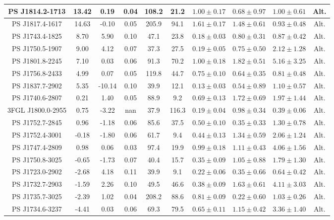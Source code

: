 \begin{table*}
\begin{tabular}{|c|c|c|c|c|c|c|c|c|c|}
\hline 
 PS J1814.2-1713 & 13.42 & 0.19 & 0.04 & 108.2 & 21.2 & $1.00\pm0.17$ & $0.68\pm0.97$ & $1.00\pm0.61$ & Alt. \\
\hline 
 PS J1817.4-1617 & 14.63 & -0.10 & 0.05 & 205.9 & 94.1 & $1.61\pm0.17$ & $1.48\pm0.61$ & $0.93\pm0.48$ & Alt. \\
\hline 
 PS J1743.4-1825 & 8.70 & 5.90 & 0.10 & 47.1 & 23.8 & $0.18\pm0.03$ & $0.80\pm0.31$ & $0.87\pm0.42$ & Alt. \\
\hline 
 PS J1750.5-1907 & 9.00 & 4.12 & 0.07 & 37.3 & 27.5 & $0.19\pm0.05$ & $0.75\pm0.50$ & $2.12\pm1.28$ & Alt. \\
\hline 
 PS J1801.8-2245 & 7.10 & 0.03 & 0.06 & 91.3 & 70.2 & $1.00\pm0.18$ & $1.82\pm0.51$ & $5.16\pm3.25$ & Alt. \\
\hline 
 PS J1756.8-2433 & 4.99 & 0.07 & 0.05 & 119.8 & 44.7 & $0.75\pm0.10$ & $0.64\pm0.35$ & $0.81\pm0.48$ & Alt. \\
\hline 
 PS J1837.7-2902 & 5.35 & -10.14 & 0.10 & 39.9 & 12.1 & $0.13\pm0.03$ & $0.54\pm0.89$ & $1.10\pm0.57$ & Alt. \\
\hline 
 PS J1740.6-2807 & 0.21 & 1.40 & 0.05 & 88.9 & 9.2 & $0.69\pm0.13$ & $1.72\pm0.69$ & $1.97\pm1.44$ & Alt. \\
\hline 
 3FGL J1800.0-2955 & 0.75 & -3.22 & nan & 37.9 & 116.3 & $0.19\pm0.04$ & $0.98\pm0.34$ & $0.39\pm0.06$ & Alt. \\
\hline 
 PS J1752.7-2845 & 0.96 & -1.18 & 0.06 & 85.6 & 37.5 & $0.50\pm0.10$ & $0.35\pm0.33$ & $1.30\pm0.78$ & Alt. \\
\hline 
 PS J1752.4-3001 & -0.18 & -1.80 & 0.06 & 61.7 & 9.4 & $0.44\pm0.13$ & $1.34\pm0.59$ & $2.06\pm1.24$ & Alt. \\
\hline 
 PS J1747.4-2809 & 0.98 & 0.06 & 0.03 & 97.4 & 19.9 & $0.99\pm0.18$ & $1.11\pm0.43$ & $4.06\pm1.56$ & Alt. \\
\hline 
 PS J1750.8-3025 & -0.65 & -1.73 & 0.07 & 40.4 & 15.7 & $0.35\pm0.09$ & $1.05\pm0.88$ & $1.79\pm1.30$ & Alt. \\
\hline 
 PS J1723.0-2902 & -2.68 & 4.18 & 0.11 & 39.9 & 9.1 & $0.22\pm0.06$ & $0.35\pm0.66$ & $0.64\pm0.42$ & Alt. \\
\hline 
 PS J1732.7-2903 & -1.59 & 2.26 & 0.10 & 49.5 & 46.6 & $0.38\pm0.09$ & $1.63\pm0.61$ & $4.11\pm3.03$ & Alt. \\
\hline 
 PS J1735.7-3025 & -2.39 & 1.02 & 0.04 & 208.2 & 88.6 & $0.81\pm0.09$ & $0.22\pm0.60$ & $1.03\pm0.26$ & Alt. \\
\hline 
 PS J1734.6-3237 & -4.41 & 0.03 & 0.06 & 69.3 & 79.5 & $0.65\pm0.11$ & $1.15\pm0.42$ & $3.36\pm1.40$ & Alt. \\

\end{tabular}
\end{table*}
